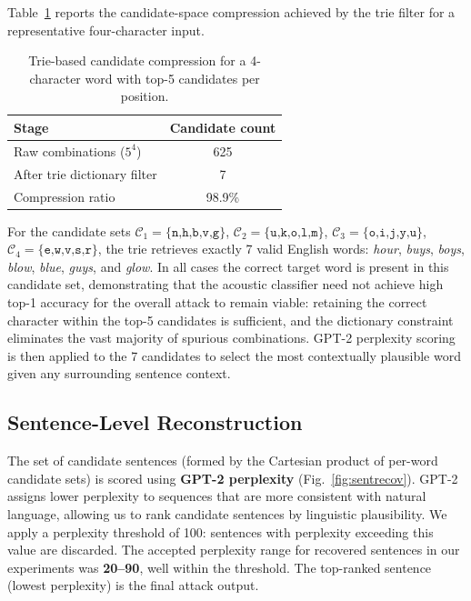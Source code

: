 \documentclass[conference]{IEEEtran}
\begin{document}
Table~\ref{tab:trie} reports the candidate-space compression
achieved by the trie filter for a representative four-character
input.

\begin{table}[t]
  \centering
  \caption{Trie-based candidate compression for a 4-character
           word with top-5 candidates per position.}
  \label{tab:trie}
  \begin{tabular}{lc}
    \hline
    \textbf{Stage} & \textbf{Candidate count} \\
    \hline
    Raw combinations ($5^4$)    & 625  \\
    After trie dictionary filter & 7    \\
    Compression ratio            & 98.9\% \\
    \hline
  \end{tabular}
\end{table}

For the candidate sets
$\mathcal{C}_1{=}\{\texttt{n,h,b,v,g}\}$,
$\mathcal{C}_2{=}\{\texttt{u,k,o,l,m}\}$,
$\mathcal{C}_3{=}\{\texttt{o,i,j,y,u}\}$,
$\mathcal{C}_4{=}\{\texttt{e,w,v,s,r}\}$,
the trie retrieves exactly 7 valid English words:
\textit{hour}, \textit{buys}, \textit{boys}, \textit{blow},
\textit{blue}, \textit{guys}, and \textit{glow}.
In all cases the correct target word is present in this candidate
set, demonstrating that the acoustic classifier need not achieve
high top-1 accuracy for the overall attack to remain viable:
retaining the correct character within the top-5 candidates is
sufficient, and the dictionary constraint eliminates the vast
majority of spurious combinations.
GPT-2 perplexity scoring is then applied to the 7 candidates to
select the most contextually plausible word given any surrounding
sentence context.


\subsection{Sentence-Level Reconstruction}
The set of candidate sentences (formed by the Cartesian product of per-word candidate sets) is scored using \textbf{GPT-2 perplexity} (Fig.~\ref{fig:sentrecov}). GPT-2 assigns lower perplexity to sequences that are more consistent with natural language, allowing us to rank candidate sentences by linguistic plausibility. We apply a perplexity threshold of 100: sentences with perplexity exceeding this value are discarded. The accepted perplexity range for recovered sentences in our experiments was \textbf{20--90}, well within the threshold. The top-ranked sentence (lowest perplexity) is the final attack output.
\end{document}
